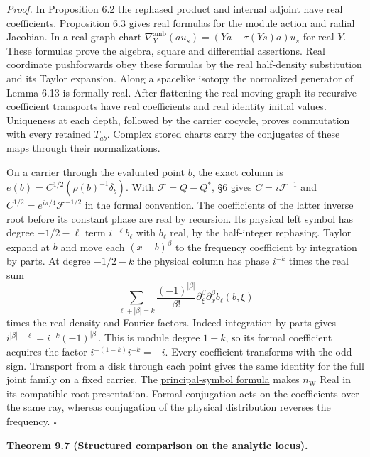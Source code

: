 \documentclass[
  english,
  11pt,
  reqno]{amsart}
\makeatletter
\newcommand{\pandocstatementheading}[1]{%
  \par\addpenalty{\@beginparpenalty}%
  \addvspace{.5\baselineskip plus .2\baselineskip minus .2\baselineskip}%
  {\normalfont\bfseries #1\par}%
  \nobreak\@afterindenttrue\@afterheading
}
\makeatother
\begin{document}
\emph{Proof.} In Proposition 6.2 the rephased product and internal
adjoint have real coefficients. Proposition 6.3 gives real formulas for
the module action and radial Jacobian. In a real graph chart
\(\nabla_Y^{\mathrm{amb}}(a u_s)=(Ya-\tau(Ys)a)u_s\) for real \(Y\).
These formulas prove the algebra, square and differential assertions.
Real coordinate pushforwards obey these formulas by the real
half-density substitution and its Taylor expansion. Along a spacelike
isotopy the normalized generator of Lemma 6.13 is formally real. After
flattening the real moving graph its recursive coefficient transports
have real coefficients and real identity initial values. Uniqueness at
each depth, followed by the carrier cocycle, proves commutation with
every retained \(T_{ab}\). Complex stored charts carry the conjugates of
these maps through their normalizations.

On a carrier through the evaluated point \(b\), the exact column is
\(e(b)=C^{1/2}(\rho(b)^{-1}\delta_b)\). With \(\mathcal F=Q-Q^*\), §6
gives \(C=i\mathcal F^{-1}\) and \(C^{1/2}=e^{i\pi/4}\mathcal F^{-1/2}\)
in the formal convention. The coefficients of the latter inverse root
before its constant phase are real by recursion. Its physical left
symbol has degree \(-1/2-\ell\) term \(i^{-\ell}b_\ell\) with \(b_\ell\)
real, by the half-integer rephasing. Taylor expand at \(b\) and move
each \((x-b)^\beta\) to the frequency coefficient by integration by
parts. At degree \(-1/2-k\) the physical column has phase \(i^{-k}\)
times the real sum \[
\sum_{\ell+|\beta|=k}\frac{(-1)^{|\beta|}}{\beta!}
\partial_\xi^\beta\partial_x^\beta b_\ell(b,\xi)
\] times the real density and Fourier factors. Indeed integration by
parts gives \(i^{|\beta|-\ell}=i^{-k}(-1)^{|\beta|}\). This is module
degree \(1-k\), so its formal coefficient acquires the factor
\(i^{-(1-k)}i^{-k}=-i\). Every coefficient transforms with the odd sign.
Transport from a disk through each point gives the same identity for the
full joint family on a fixed carrier. The
\hyperref[eq:relative-wave-native-frame]{principal-symbol formula} makes
\(n_{\mathrm W}\) Real in its compatible root presentation. Formal
conjugation acts on the coefficients over the same ray, whereas
conjugation of the physical distribution reverses the frequency.
\hfill\(\square\)

\pandocstatementheading{\leavevmode{}\label{thm:analytic-structured-wave-comparison}Theorem 9.7 (Structured comparison on the analytic locus).}
\end{document}
